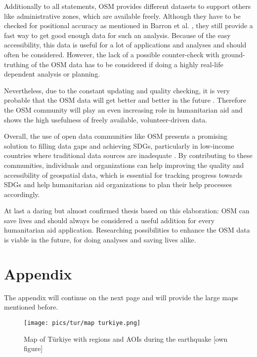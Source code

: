 \documentclass[oneside,twocolumn,10pt,cleanfoot,cleanhead]{asme2ej}
\begin{document}
Additionally to all statements, OSM provides different datasets to support others like administrative zones, which are available freely.
Although they have to be checked for positional accuracy as mentioned in Barron et al. \cite{BarronEA2014}, they still provide a fast way to get good enough data for such an analysis.
Because of the easy accessibility, this data is useful for a lot of applications and analyses and should often be considered.
However, the lack of a possible counter-check with ground-truthing of the OSM data has to be considered if doing a highly real-life dependent analysis or planning.

Nevertheless, due to the constant updating and quality checking, it is very probable that the OSM data will get better and better in the future \cite{HerfortEA2021, ScholzEA2018}.
Therefore the OSM community will play an even increasing role in humanitarian aid and shows the high usefulness of freely available, volunteer-driven data.

Overall, the use of open data communities like OSM presents a promising solution to filling data gaps and achieving SDGs, particularly in low-income countries where traditional data sources are inadequate \cite{FritzEA2019, ScholzEA2018, GreenoughNelson2019}. 
By contributing to these communities, individuals and organizations can help improving the quality and accessibility of geospatial data, which is essential for tracking progress towards SDGs and help humanitarian aid organizations to plan their help processes accordingly.

At last a daring but almost confirmed thesis based on this elaboration: OSM can save lives and should always be considered a useful addition for every humanitarian aid application.
Researching possibilities to enhance the OSM data is viable in the future, for doing analyses and saving lives alike.






\appendix
\section*{Appendix}
\label{appendix}

The appendix will continue on the next page and will provide the large maps mentioned before.

\begin{figure*}
    \centerline{\texttt{[image: pics/tur/map turkiye.png]}}
    \caption{Map of Türkiye with regions and AOIs during the earthquake [own figure]}
    \label{map turkiye}
\end{figure*}
\end{document}
